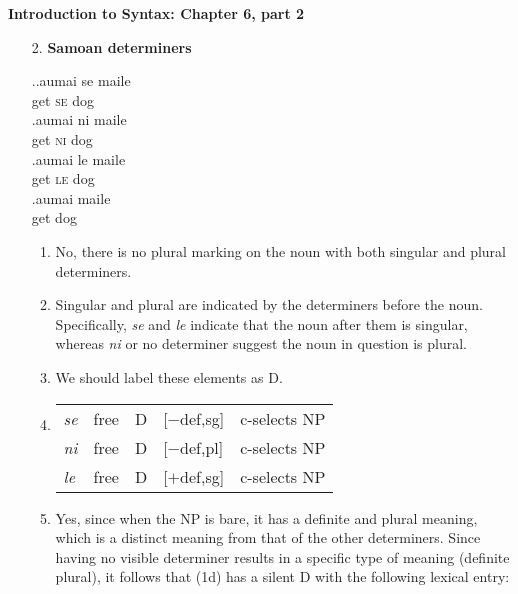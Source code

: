 \documentclass[a4paper,12pt]{article}
\begin{document}
\noindent\textbf{Introduction to Syntax: Chapter 6, part 2}\par

\vspace{1em}
\begin{enumerate}
	\item[2.]\textbf{Samoan determiners}

    	\ex.\ag.{\textglotstop}aumai  se maile\\
			get \textsc{se} dog \\
            \bg.{\textglotstop}aumai  ni maile\\
			get \textsc{ni} dog \\
            \bg.{\textglotstop}aumai  le maile\\
			get \textsc{le} dog \\
            \bg.{\textglotstop}aumai maile\\
			get dog \\

    	\begin{enumerate}[label=(\roman*)]
        	\item No, there is no plural marking on the noun with both singular and plural determiners.

         \item Singular and plural are indicated by the determiners before the noun. Specifically, \textit{se} and \textit{le} indicate that the noun after them is singular, whereas \textit{ni} or no determiner suggest the noun in question is plural.

         \item We should label these elements as D.

         \item \begin{tabular}[t]{l|l|l|l|l}
                  \textit{se} & free & D & [$-$def,sg] & c-selects NP \\
                  \textit{ni} & free & D & [$-$def,pl] & c-selects NP \\
                  \textit{le} & free & D & [$+$def,sg] & c-selects NP
               \end{tabular}


         \item Yes, since when the NP is bare, it has a definite and plural meaning, which is a distinct meaning from that of the other determiners. Since having no visible determiner results in a specific type of meaning (definite plural), it follows that (1d) has a silent D with the following lexical entry:


\end{enumerate}
\end{enumerate}
\end{document}
